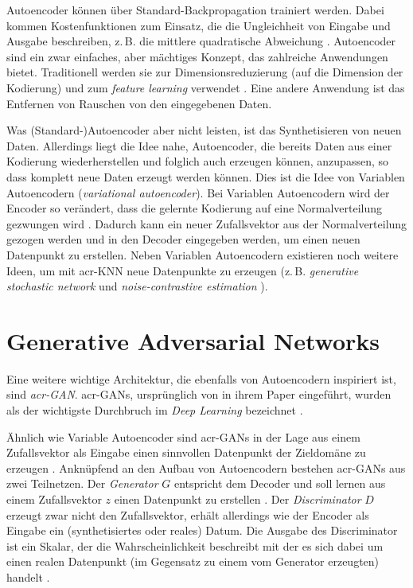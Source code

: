 Autoencoder können über Standard-Backpropagation trainiert werden. Dabei kommen
Kostenfunktionen zum Einsatz, die die Ungleichheit von Eingabe und Ausgabe
beschreiben, z.\,B. die mittlere quadratische Abweichung \cite[S.
502f.]{goodfellow2016deep}. Autoencoder sind ein zwar einfaches, aber mächtiges
Konzept, das zahlreiche Anwendungen bietet. Traditionell werden sie zur
Dimensionsreduzierung (auf die Dimension der Kodierung) und zum \emph{feature
learning} verwendet \cite[S. 502]{goodfellow2016deep}. Eine andere Anwendung ist
das Entfernen von Rauschen von den eingegebenen Daten.

Was (Standard-)Autoencoder aber nicht leisten, ist das Synthetisieren von neuen
Daten. Allerdings liegt die Idee nahe, Autoencoder, die bereits Daten aus einer
Kodierung wiederherstellen und folglich auch erzeugen können, anzupassen, so dass
komplett neue Daten erzeugt werden können. Dies ist die Idee von Variablen Autoencodern
(\emph{variational autoencoder}). Bei Variablen Autoencodern wird der Encoder
so verändert, dass die gelernte Kodierung auf eine Normalverteilung gezwungen
wird \cite[S. 653]{raschka2019}. Dadurch kann ein neuer Zufallsvektor aus der
Normalverteilung gezogen werden und in den Decoder eingegeben werden, um einen
neuen Datenpunkt zu erstellen.
Neben Variablen Autoencodern existieren noch weitere Ideen, um mit
\gls{acr-KNN} neue Datenpunkte zu erzeugen (z.\,B. \emph{generative
stochastic network} und
\emph{noise-contrastive estimation} \cite[S. 2]{goodfellow2014generative}).

\section{Generative Adversarial Networks}\label{GANs}

Eine weitere wichtige Architektur, die ebenfalls von Autoencodern inspiriert ist,
sind \emph{\gls{acr-GAN}}. \gls{acr-GAN}s, ursprünglich \citeyear{goodfellow2014generative} von
\citeauthor{goodfellow2014generative} in ihrem Paper
 eingeführt, wurden als der wichtigste Durchbruch im
\emph{Deep Learning} bezeichnet \cite[S. 619]{raschka2019}.

Ähnlich wie Variable Autoencoder sind \gls{acr-GAN}s in der Lage aus einem Zufallsvektor
als Eingabe einen sinnvollen Datenpunkt der Zieldomäne zu erzeugen \cite[S.
2]{goodfellow2014generative}. Anknüpfend an den Aufbau von Autoencodern bestehen
\gls{acr-GAN}s aus zwei Teilnetzen. Der \emph{Generator} $G$ entspricht dem
Decoder und soll lernen aus einem Zufallsvektor $z$ einen Datenpunkt zu
erstellen \cites[S. 3]{goodfellow2014generative}[S. 623]{raschka2019}. Der
\emph{Discriminator} $D$ erzeugt zwar nicht den Zufallsvektor,
erhält allerdings wie der Encoder als Eingabe ein (synthetisiertes oder reales)
Datum. Die Ausgabe des Discriminator ist ein Skalar, der die
Wahrscheinlichkeit beschreibt 
mit der es sich dabei um einen realen Datenpunkt (im Gegensatz zu einem vom
Generator erzeugten) handelt \cite[S. 1,3]{goodfellow2014generative}.

